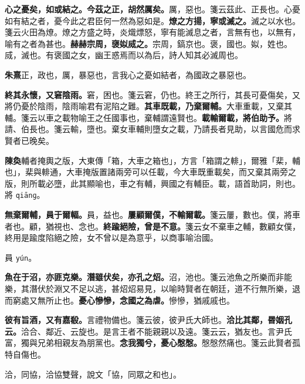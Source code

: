 \textbf{心之憂矣，如或結之。今茲之正，胡然厲矣。}{\footnotesize 厲，惡也。箋云茲此、正長也。心憂如有結之者，憂今此之君臣何一然為惡如是。}\textbf{燎之方揚，寧或滅之。}{\footnotesize 滅之以水也。箋云火田為燎。燎之方盛之時，炎熾熛怒，寧有能滅息之者，言無有也，以無有，喻有之者為甚也。}\textbf{赫赫宗周，襃姒烕之。}{\footnotesize 宗周，鎬京也。褒，國也。姒，姓也。烕，滅也。有褒國之女，幽王惑焉而以為后，詩人知其必滅周也。}

\begin{quoting}\textbf{朱熹}正，政也，厲，暴惡也，言我心之憂如結者，為國政之暴惡也。\end{quoting}

\textbf{終其永懷，又窘陰雨。}{\footnotesize 窘，困也。箋云窘，仍也。終王之所行，其長可憂傷矣，又將仍憂於陰雨，陰雨喻君有泥陷之難。}\textbf{其車既載，乃棄爾輔。}{\footnotesize 大車重載，又棄其輔。箋云以車之載物喻王之任國事也，棄輔謂遠賢也。}\textbf{載輸爾載，將伯助予。}{\footnotesize 將請、伯長也。箋云輸，墮也。棄女車輔則墮女之載，乃請長者見助，以言國危而求賢者已晚矣。}

\begin{quoting}\textbf{陳奐}輔者掩輿之版，大東傳「箱，大車之箱也」，方言「箱謂之輫」，爾雅「棐，輔也」，棐與輫通，大車掩版置諸兩旁可以任載，今大車既重載矣，而又棄其兩旁之版，則所載必墮，此其顯喻也，車之有輔，興國之有輔臣。載，語首助詞，則也。將 \texttt{qiānɡ}。\end{quoting}

\textbf{無棄爾輔，員于爾輻。}{\footnotesize 員，益也。}\textbf{屢顧爾僕，不輸爾載。}{\footnotesize 箋云屢，數也。僕，將車者也。顧，猶視也、念也。}\textbf{終踰絕險，曾是不意。}{\footnotesize 箋云女不棄車之輔，數顧女僕，終用是踰度陷絕之險，女不曾以是為意乎，以商事喻治國。}

\begin{quoting}員 \texttt{yún}。\end{quoting}

\textbf{魚在于沼，亦匪克樂。潛雖伏矣，亦孔之炤。}{\footnotesize 沼，池也。箋云池魚之所樂而非能樂，其潛伏於淵又不足以逃，甚炤炤易見，以喻時賢者在朝廷，道不行無所樂，退而窮處又無所止也。}\textbf{憂心慘慘，念國之為虐。}{\footnotesize 慘慘，猶戚戚也。}

\textbf{彼有旨酒，又有嘉殽。}{\footnotesize 言禮物備也。箋云彼，彼尹氏大師也。}\textbf{洽比其鄰，昬姻孔云。}{\footnotesize 洽合、鄰近、云旋也。是言王者不能親親以及遠。箋云云，猶友也。言尹氏富，獨與兄弟相親友為朋黨也。}\textbf{念我獨兮，憂心慇慇。}{\footnotesize 慇慇然痛也。箋云此賢者孤特自傷也。}

\begin{quoting}洽，同協，洽協雙聲，說文「協，同眾之和也」。\end{quoting}

